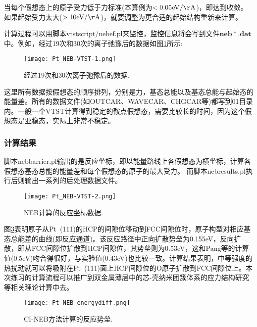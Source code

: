当每个假想态上的原子受力低于力标准(本算例为$<0.05\mathrm{eV/\AA}$)，即达到收敛。如果起始受力太大($>10\mathrm{eV/\AA}$)，就要调整为更合适的起始结构重新来计算。

计算过程可以用脚本\textrm{vtstscript/nebef.pl}来监控，监控信息将会写到文件$\mathbf{neb}\ast\mathbf{.dat}$中。例如，经过19次和30次的离子弛豫后的数据如图\ref{Pt_NEB-VTST-1}所示:
\begin{figure}[h!]
\centering
\texttt{[image: Pt\_NEB-VTST-1.png]}
\caption{\small \textrm{经过19次和30次离子弛豫后的数据.}}%
\label{Pt_NEB-VTST-1}
\end{figure}

这里所有数据按假想态的顺序排列，分别是力，基态总能以及基态总能与起始态的能量差。所有的数据文件(如\textrm{OUTCAR}、\textrm{WAVECAR}、\textrm{CHGCAR}等)都写到01目录内。一般一个\textrm{VTST}计算得到稳定的鞍点假想态，需要比较长的时间，因为这个假想态是亚稳态，实际上非常不稳定。
\subsubsection{计算结果}
脚本\textrm{nebbarrier.pl}输出的是反应坐标，即以能量路线上各假想态为横坐标，计算各假想态基态总能的能量差和每个假想态的原子的最大受力。 而脚本\textrm{nebresults.pl}执行后则输出一系列的后处理数据文件。
\begin{figure}[h!]
\centering
\texttt{[image: Pt\_NEB-VTST-2.png]}
\caption{\small \textrm{NEB}计算的反应坐标数据.}%
\label{Pt_NEB-VTST-2}
\end{figure}

图\ref{Pt_NEB-energydiff}表明原子从\textrm{Pt~(111)}的\textrm{HCP}的间隙位移动到\textrm{FCC}间隙位时，原子构型对相应基态总能差的曲线(即反应通道)。该反应路径中正向扩散势垒为0.155\textrm{eV}，反向扩散，即从\textrm{FCC}间隙位扩散到\textrm{HCP}间隙位，其势垒则为0.53\textrm{eV}，这和\textrm{Pang}等的计算值(0.5\textrm{eV})\cite{ASS257-3047_2011}吻合得很好，与实验值(0.43\textrm{eV})\cite{PRL77-123_1996}也比较一致。计算结果表明，中等强度的热扰动就可以将吸附在\textrm{Pt~(111)}面上\textrm{HCP}间隙位的\textrm{O}原子扩散到\textrm{FCC}间隙位上。本次练习的计算流程可以推广到双金属薄层\cite{PRL81-2819_1998}中的芯-壳纳米团簇体系的应力结构研究等相关理论计算中去。
\begin{figure}[h!]
\centering
\texttt{[image: Pt\_NEB-energydiff.png]}
\caption{\small \textrm{CI-NEB}方法计算的反应势垒.}%
\label{Pt_NEB-energydiff}
\end{figure}


